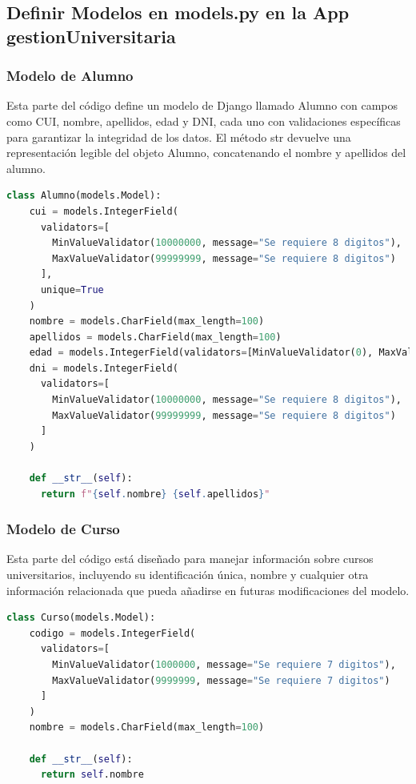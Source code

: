 \documentclass{article}
\begin{document}

  \subsection{Definir Modelos en models.py en la App gestionUniversitaria}
  

  \subsubsection{Modelo de Alumno}
  Esta parte del código define un modelo de Django llamado Alumno con campos como CUI, nombre, apellidos, edad y DNI, 
  cada uno con validaciones específicas para garantizar la integridad de los datos. El método str devuelve una representación 
  legible del objeto Alumno, concatenando el nombre y apellidos del alumno.
  \begin{lstlisting}[language=python, caption={Modelo Alumno}]
  class Alumno(models.Model):
    cui = models.IntegerField(
      validators=[
        MinValueValidator(10000000, message="Se requiere 8 digitos"), 
        MaxValueValidator(99999999, message="Se requiere 8 digitos")
      ], 
      unique=True
    )
    nombre = models.CharField(max_length=100)
    apellidos = models.CharField(max_length=100)
    edad = models.IntegerField(validators=[MinValueValidator(0), MaxValueValidator(100)])
    dni = models.IntegerField(
      validators=[
        MinValueValidator(10000000, message="Se requiere 8 digitos"), 
        MaxValueValidator(99999999, message="Se requiere 8 digitos")
      ]
    )
    
    def __str__(self):
      return f"{self.nombre} {self.apellidos}"
  \end{lstlisting}
  

  \subsubsection{Modelo de Curso}
  Esta parte del código está diseñado para manejar información sobre cursos universitarios, incluyendo su identificación única, 
  nombre y cualquier otra información relacionada que pueda añadirse en futuras modificaciones del modelo.
  \begin{lstlisting}[language=python, caption={Modelo Curso}]
  class Curso(models.Model):
    codigo = models.IntegerField(
      validators=[
        MinValueValidator(1000000, message="Se requiere 7 digitos"), 
        MaxValueValidator(9999999, message="Se requiere 7 digitos")
      ]
    )
    nombre = models.CharField(max_length=100)
    
    def __str__(self):
      return self.nombre
  \end{lstlisting}
\end{document}
